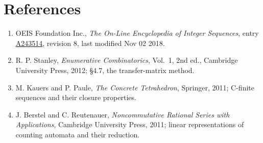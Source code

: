 \documentclass[11pt]{article}
\theoremstyle{definition}
\begin{document}
\section{References}

\begin{enumerate}

\item OEIS Foundation Inc., \emph{The On-Line Encyclopedia of Integer Sequences}, entry \href{https://oeis.org/A243514}{A243514}, revision 8, last modified Nov 02 2018.

\item R. P. Stanley, \emph{Enumerative Combinatorics}, Vol.~1, 2nd ed., Cambridge University Press, 2012; \S4.7, the transfer-matrix method.

\item M. Kauers and P. Paule, \emph{The Concrete Tetrahedron}, Springer, 2011; C-finite sequences and their closure properties.

\item J. Berstel and C. Reutenauer, \emph{Noncommutative Rational Series with Applications}, Cambridge University Press, 2011; linear representations of counting automata and their reduction.

\end{enumerate}
\end{document}
